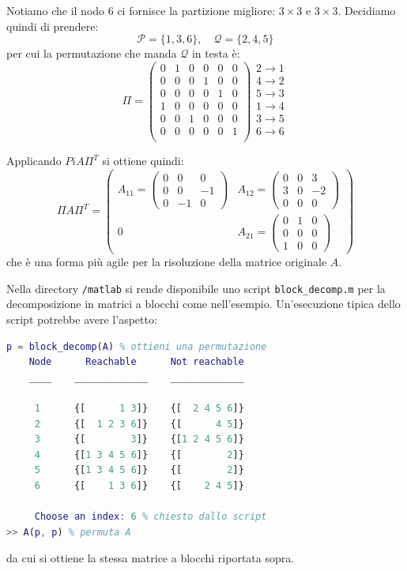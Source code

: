 \documentclass[a4paper,11pt]{article}
\begin{document}
Notiamo che il nodo 6 ci fornisce la partizione migliore: $3 \times 3$ e $3 \times 3$.
Decidiamo quindi di prendere:
$$
\mathcal{P} = \{ 1, 3, 6 \}, \quad \mathcal{Q} = \{ 2, 4, 5 \}
$$
per cui la permutazione che manda $\mathcal{Q}$ in testa è:
$$
\Pi = \begin{pmatrix}
	0 & 1 & 0 & 0 & 0 & 0 \\
	0 & 0 & 0 & 1 & 0 & 0 \\
	0 & 0 & 0 & 0 & 1 & 0 \\
	1 & 0 & 0 & 0 & 0 & 0 \\
	0 & 0 & 1 & 0 & 0 & 0 \\
	0 & 0 & 0 & 0 & 0 & 1 \\
\end{pmatrix}
\begin{array}{c}
	2 \rightarrow 1 \\
	4 \rightarrow 2 \\
	5 \rightarrow 3 \\
	1 \rightarrow 4 \\
	3 \rightarrow 5 \\
	6 \rightarrow 6 \\
\end{array}
$$

Applicando $Pi A \Pi^T$ si ottiene quindi:
$$
\Pi A \Pi^T = \begin{pmatrix}
	A_{11} =
	\begin{pmatrix}
		0 &  0 &  0 \\
		0 &  0 & -1 \\
		0 & -1 &  0
	\end{pmatrix} &
	A_{12} = 
	\begin{pmatrix}
		0 &  0 &  3 \\
		3 &  0 & -2 \\
		0 &  0 &  0
	\end{pmatrix} \\
	0 &
	A_{21} = 
	\begin{pmatrix}
		0 &  1 &  0 \\
		0 &  0 &  0 \\
		1 &  0 &  0
	\end{pmatrix}
\end{pmatrix}
$$
che è una forma più agile per la risoluzione della matrice originale $A$.

Nella directory \lstinline|/matlab| si rende disponibile uno script \lstinline|block_decomp.m| per la decomposizione in matrici a blocchi come nell'esempio.
Un'esecuzione tipica dello script potrebbe avere l'aspetto:
\begin{lstlisting}[language=matlab, style=codestyle]	
p = block_decomp(A) % ottieni una permutazione
    Node      Reachable      Not reachable
    ____    _____________    _____________

     1      {[      1 3]}    {[  2 4 5 6]}
     2      {[  1 2 3 6]}    {[      4 5]}
     3      {[        3]}    {[1 2 4 5 6]}
     4      {[1 3 4 5 6]}    {[        2]}
     5      {[1 3 4 5 6]}    {[        2]}
     6      {[    1 3 6]}    {[    2 4 5]}
   
	 Choose an index: 6 % chiesto dallo script
>> A(p, p) % permuta A
\end{lstlisting}
da cui si ottiene la stessa matrice a blocchi riportata sopra.
\end{document}

